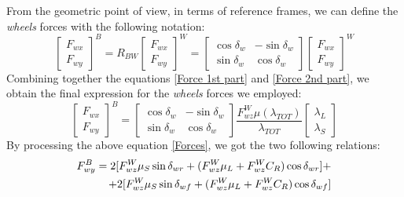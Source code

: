 \documentclass[a4paper,12pt,titlepage]{report}
\numberwithin{figure}{section}
\begin{document}
		From the geometric point of view, in terms of reference frames, we can define the \textit{wheels} forces with the following notation:
			\begin{equation} \label{Force 2nd part}
				\begin{bmatrix}
					F_{wx} \\
					F_{wy}
				\end{bmatrix}^{B} =	
				R_{BW}
				\begin{bmatrix}
					F_{wx} \\
					F_{wy}
				\end{bmatrix}^{W} =
				\begin{bmatrix}
					\cos\delta_{w} & -\sin\delta_{w} \\
					\sin\delta_{w} & \cos\delta_{w}
				\end{bmatrix}
				\begin{bmatrix}
					F_{wx} \\
					F_{wy}
				\end{bmatrix}^{W}
			\end{equation}
		Combining together the equations \ref{Force 1st part} and \ref{Force 2nd part}, we obtain the final expression for the \textit{wheels} forces we employed:
			\begin{equation} \label{Forces}
				\begin{bmatrix}
					F_{wx} \\
					F_{wy}
				\end{bmatrix}^{B} =	
				\begin{bmatrix}
					\cos\delta_{w} & -\sin\delta_{w} \\
					\sin\delta_{w} & \cos\delta_{w}
				\end{bmatrix}
				\frac{F_{wz}^{W} \mu(\lambda_{TOT})}{\lambda_{TOT}}
				\begin{bmatrix}
					\lambda_{L} \\
					\lambda_{S}
				\end{bmatrix}
			\end{equation}
		By processing the above equation \ref{Forces}, we got the two following relations:
			\begin{equation} \label{F_{wy}}
			\begin{split}
				F_{wy}^{B} = 2 [F_{wz}^{W} \mu_{S}\sin\delta_{wr} + (F_{wz}^{W} \mu_{L} + F_{wz}^{W} C_{R}) \cos\delta_{wr}] + \\ + 2 [F_{wz}^{W} \mu_{S}\sin\delta_{wf} + (F_{wz}^{W} \mu_{L} + F_{wz}^{W} C_{R})\cos\delta_{wf}] 
			\end{split}
			\end{equation}
\end{document}
